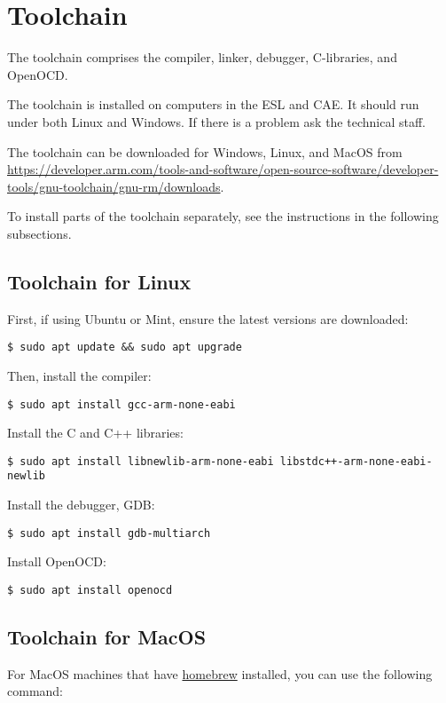 \section{Toolchain}
\label{toolchain}

The toolchain comprises the compiler, linker, debugger, C-libraries,
and OpenOCD.

The toolchain is installed on computers in the ESL and CAE. It should
run under both Linux and Windows.  If there is a problem ask the
technical staff.

The toolchain can be downloaded for Windows, Linux, and MacOS
from \url{https://developer.arm.com/tools-and-software/open-source-software/developer-tools/gnu-toolchain/gnu-rm/downloads}.

To install parts of the toolchain separately, see the instructions in
the following subsections.


\subsection{Toolchain for Linux}

First, if using Ubuntu or Mint, ensure the latest versions are
downloaded:
%
\begin{verbatim}
$ sudo apt update && sudo apt upgrade
\end{verbatim}

Then, install the compiler:
%
\begin{verbatim}
$ sudo apt install gcc-arm-none-eabi
\end{verbatim}

Install the C and C++ libraries:
%
\begin{verbatim}    
$ sudo apt install libnewlib-arm-none-eabi libstdc++-arm-none-eabi-newlib
\end{verbatim}

Install the debugger, GDB:
%
\begin{verbatim}    
$ sudo apt install gdb-multiarch
\end{verbatim}

Install OpenOCD:
%
\begin{verbatim}
$ sudo apt install openocd
\end{verbatim}

\subsection{Toolchain for MacOS}

For MacOS machines that have \href{https://brew.sh}{homebrew}
installed, you can use the following command:

